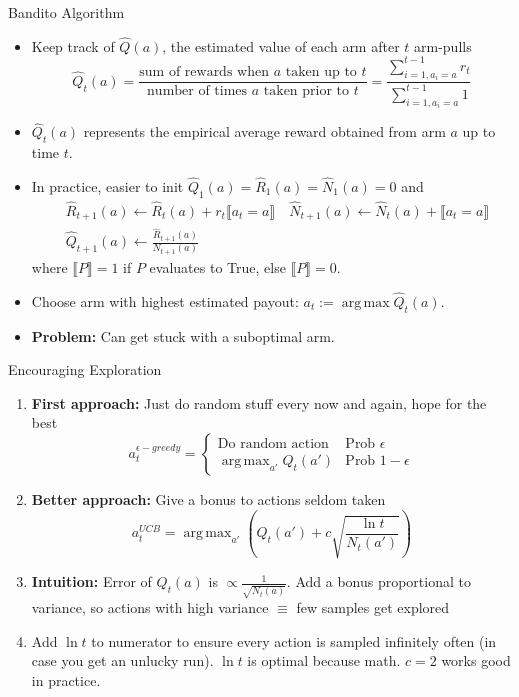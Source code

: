 \documentclass[10pt,a4paper]{beamer}
\DeclareMathOperator*{\argmax}{arg\,max}
\newcommand{\iver}[1]{\llbracket  {#1} \rrbracket}
\begin{document}
\begin{frame}{Bandito Algorithm}
	\begin{itemize}
		\item Keep track of $\hat{Q}(a)$, the estimated value of each arm
		after $t$ arm-pulls
		$$
		\hat{Q}_t(a) = \frac{\text{sum of rewards when $a$ taken up to $t$}}
		{\text{number of times $a$ taken prior to $t$}}
		= \frac{\sum_{i=1, a_i=a}^{t-1} r_t  }{\sum_{i=1,a_i=a}^{t-1} 1} 
		$$
		\pause 
		\item
		$\hat{Q}_t(a)$ represents the empirical average reward obtained from arm $a$
		up to time $t$. 
		\pause 
		\item In practice, easier to init 
		$\hat{Q}_1(a) = \hat{R}_1(a) = \hat{N}_1(a) = 0$ and
		\begin{align*}
			&\hat{R}_{t+1}(a) \leftarrow \hat{R}_{t}(a) + r_t \iver{a_t=a} 
		\quad \hat{N}_{t+1}(a) \leftarrow \hat{N}_{t}(a) + \iver{a_t=a} \\
		& \hat{Q}_{t+1}(a) \leftarrow \frac{\hat{R}_{t+1}(a)}{N_{t+1}(a)}
		\end{align*}
	where $\iver{P} = 1$ if $P$ evaluates to True, else $\iver{P}=0$.
	\pause 
	\item Choose arm with highest estimated payout: $a_t := \argmax \hat{Q}_t(a)$.
	\pause
	\item \textbf{Problem:} Can get stuck with a suboptimal arm.
	\end{itemize}
\end{frame}

\begin{frame}{Encouraging Exploration}
	\begin{enumerate}
		\item \textbf{First approach:} Just do random stuff every now and 
		again, hope for the best
		$$
		a^{\epsilon-greedy}_t = \begin{cases}
			\text{Do random action} & \text{Prob } \epsilon \\
			\argmax_{a'} Q_t(a') & \text{Prob } 1-\epsilon 
		\end{cases}
		$$
		\pause
		\item \textbf{Better approach:} Give a bonus to actions seldom taken
		$$
		a^{UCB}_t = \argmax_{a'}
		\left( 
		Q_t(a') + c \sqrt{\frac{\ln t}{N_t(a')}}
		\right)
		$$
		\pause
		\item \textbf{Intuition:} Error of
		$Q_t(a)$ is  $\propto \frac{1}{\sqrt{N_t(a)}}$. Add a bonus proportional to variance,
		so actions with high variance $\equiv$ few samples get explored
		\pause
		\item Add $\ln t$ to numerator to ensure every action is sampled
		infinitely often (in case you get an unlucky run). $\ln t$ is optimal
		because math. $c=2$ works good in practice.
	\end{enumerate}
	
\end{frame}
\end{document}
